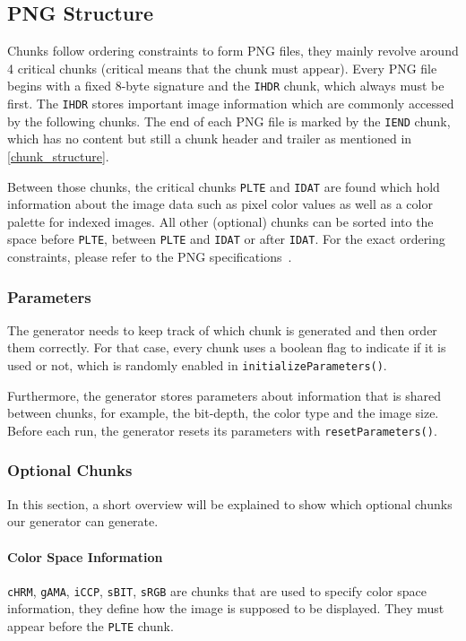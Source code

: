 \documentclass[runningheads]{llncs}
\begin{document}
\subsection{PNG Structure}
Chunks follow ordering constraints to form PNG files, they mainly revolve around 4 critical chunks (critical means that the chunk must appear). 
Every PNG file begins with a fixed 8-byte signature and the \texttt{IHDR} chunk, which always must be first. The \texttt{IHDR} stores important image information which are commonly accessed by the following chunks.
The end of each PNG file is marked by the \texttt{IEND} chunk, which has no content but still a chunk header and trailer as mentioned in \ref{chunk_structure}.

Between those chunks, the critical chunks \texttt{PLTE} and \texttt{IDAT} are found which hold information about the image data such as pixel color values as well as a color palette for indexed images. 
All other (optional) chunks can be sorted into the space before \texttt{PLTE}, between \texttt{PLTE} and \texttt{IDAT} or after \texttt{IDAT}. 
For the exact ordering constraints, please refer to the PNG specifications~\cite{libpng_chunks}.
\subsubsection{Parameters}
The generator needs to keep track of which chunk is generated and then order them correctly. For that case, every chunk uses a boolean flag to indicate if it is used or not, which is randomly enabled in \texttt{initializeParameters()}.

Furthermore, the generator stores parameters about information that is shared between chunks, for example, the bit-depth, the color type and the image size. 
Before each run, the generator resets its parameters with \texttt{resetParameters()}.
\subsubsection{Optional Chunks}
In this section, a short overview will be explained to show which optional chunks~\cite{libpng_chunks} our generator can generate.

\paragraph{Color Space Information}
\texttt{cHRM}, \texttt{gAMA}, \texttt{iCCP}, \texttt{sBIT}, \texttt{sRGB} are chunks that are used to specify color space information, they define how the image is supposed to be displayed. They must appear before the \texttt{PLTE} chunk.
\end{document}
